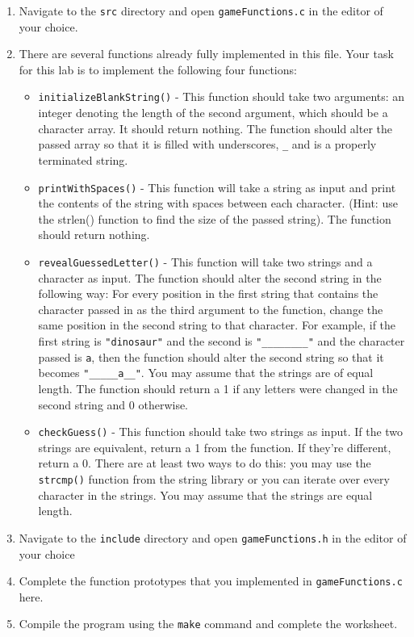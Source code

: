 \documentclass[12pt]{scrartcl}
\begin{document}
\begin{enumerate}
  \item Navigate to the \texttt{src} directory and open 
  	\texttt{gameFunctions.c} in the editor of your choice.
  \item There are several functions already fully implemented in this file.  
	Your task for this lab is to implement the following four functions:
	\begin{itemize}
	  \item \texttt{initializeBlankString()} - This function should 
	  take two arguments: an integer denoting the length of the 
	  second argument, which should be a character array.  It should 
	  return nothing.   The function should alter the passed array so that 
	  it is filled with underscores, \texttt{_} and is a properly 
	  terminated string.
	  \item \texttt{printWithSpaces()} - This function will take a 
	  string as input and print the contents of the string with spaces 
	  between each character.  (Hint: use the strlen() function to find 
	  the size of the passed string).   The function should return nothing.
	  \item \texttt{revealGuessedLetter()} - This function will take 
	  two strings and a character as input.   The function should alter 
	  the second string in the following way: For every position in the 
	  first string that contains the character passed in as the third 
	  argument to the function, change the same position in the second 
	  string to that character.  For example, if the first string is 
	  \texttt{"dinosaur"} and the second is \texttt{"________"}
	  and the character passed is \texttt{a}, then the function 
	  should alter the second string so that it becomes \texttt{"_____a__"}.
	  You may assume that the strings are of equal length.   The function 
	  should return a 1 if any letters were changed in the second 
	  string and 0 otherwise.
	  \item \texttt{checkGuess()} - This function should take 
	  two strings as input.  If the two strings are equivalent, return a 
	  1 from the function.  If they're different, return a 0.  There are at 
	  least two ways to do this: you may use the \texttt{strcmp()} 
	  function from the string library or you can iterate over every character 
	  in the strings.  You may assume that the strings are equal length.
	\end{itemize}

  \item Navigate to the \texttt{include} directory and open 
	\texttt{gameFunctions.h} in the editor of your choice
  \item Complete the function prototypes that you implemented in 
	\texttt{gameFunctions.c} here.  
  \item Compile the program using the \texttt{make} command and 
	complete the worksheet.  
\end{enumerate}
\end{document}
